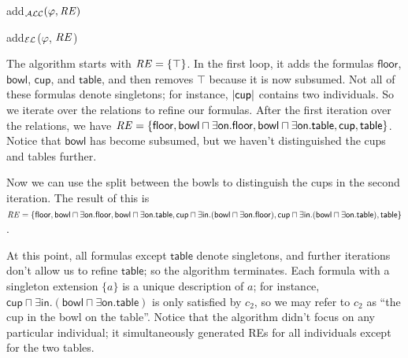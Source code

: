 \begin{algorithm}[t]
\caption{add$_\mathcal{ALC}(\varphi,\mathit{RE})$}
\label{algo:bisim-add-alc}
\end{algorithm}
%
\begin{algorithm}[t]
\dontprintsemicolon
\caption{add$_\mathcal{EL}$($\varphi$, $\mathit{RE}$)}
\label{algo:bisim-add-el}
\end{algorithm}

The algorithm starts with $\mathit{RE} = \{\top\}$.  In the first loop, it
adds the formulas $\mathsf{floor}$, $\mathsf{bowl}$, $\mathsf{cup}$,
and $\mathsf{table}$, and then removes $\top$ because it is now
subsumed.  Not all of these formulas denote singletons; for instance,
$|\mathsf{cup}|$ contains two individuals.  So we iterate over
the relations to refine our formulas.  After the first iteration over
the relations, we have $\mathit{RE} = \{ \mathsf{floor}, \mathsf{bowl} \sqcap
\exists \mathsf{on}.\mathsf{floor}, \mathsf{bowl} \sqcap \exists
\mathsf{on}.\mathsf{table}, \mathsf{cup}, \mathsf{table} \}$. Notice
that $\mathsf{bowl}$ has become subsumed, but we haven't distinguished
the cups and tables further.

Now we can use the split between the bowls to distinguish the cups in
the second iteration.  The result of this is $\mathit{RE} = \{ \mathsf{floor},
\mathsf{bowl} \sqcap \exists \mathsf{on}.\mathsf{floor}, \mathsf{bowl}
\sqcap \exists \mathsf{on}.\mathsf{table}, \mathsf{cup} \sqcap \exists
\mathsf{in}. (\mathsf{bowl} \sqcap \exists
\mathsf{on}.\mathsf{floor}), \mathsf{cup} \sqcap \exists
\mathsf{in}. (\mathsf{bowl} \sqcap \exists
\mathsf{on}.\mathsf{table}), \mathsf{table} \}$.

At this point, all formulas except $\mathsf{table}$ denote singletons,
and further iterations don't allow us to refine $\mathsf{table}$; so
the algorithm terminates.  Each formula with a singleton extension
$\{a\}$ is a unique description of $a$; for instance, $\mathsf{cup}
\sqcap \exists \mathsf{in}. (\mathsf{bowl} \sqcap \exists
\mathsf{on}.\mathsf{table})$ is only satisfied by $c_2$, so we may
refer to $c_2$ as ``the cup in the bowl on the table''.  Notice that
the algorithm didn't focus on any particular individual; it
simultaneously generated REs for all individuals except for the two
tables.

